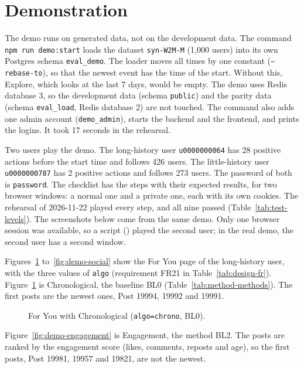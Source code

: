 \section{Demonstration}
\label{sec:test-demo}

The demo runs on generated data, not on the development data. The command \texttt{npm run demo:start} loads the dataset \texttt{syn-W2M-M} (1,000 users) into its own Postgres schema \texttt{eval\_demo}. The loader moves all times by one constant (\texttt{--rebase-to}), so that the newest event has the time of the start. Without this, Explore, which looks at the last 7 days, would be empty. The demo uses Redis database 3, so the development data (schema \texttt{public}) and the parity data (schema \texttt{eval\_load}, Redis database 2) are not touched. The command also adds one admin account (\texttt{demo\_admin}), starts the backend and the frontend, and prints the logins. It took 17 seconds in the rehearsal.

Two users play the demo. The long-history user \texttt{u0000000064} has 28 positive actions before the start time and follows 426 users. The little-history user \texttt{u0000000787} has 2 positive actions and follows 273 users. The password of both is \texttt{password}. The checklist  has the steps with their expected results, for two browser windows: a normal one and a private one, each with its own cookies. The rehearsal of 2026-11-22 played every step, and all nine passed (Table~\ref{tab:test-levels}). The screenshots below come from the same demo. Only one browser session was available, so a script () played the second user; in the real demo, the second user has a second window.

Figures~\ref{fig:demo-chrono} to~\ref{fig:demo-social} show the For You page of the long-history user, with the three values of \texttt{algo} (requirement FR21 in Table~\ref{tab:design-fr}). Figure~\ref{fig:demo-chrono} is Chronological, the baseline BL0 (Table~\ref{tab:method-methods}). The first posts are the newest ones, Post 19994, 19992 and 19991.

\begin{figure}[htbp]
  \centering
  \caption{For You with Chronological (\texttt{algo=chrono}, BL0).}
  \label{fig:demo-chrono}
\end{figure}

Figure~\ref{fig:demo-engagement} is Engagement, the method BL2. The posts are ranked by the engagement score (likes, comments, reposts and age), so the first posts, Post 19981, 19957 and 19821, are not the newest.

